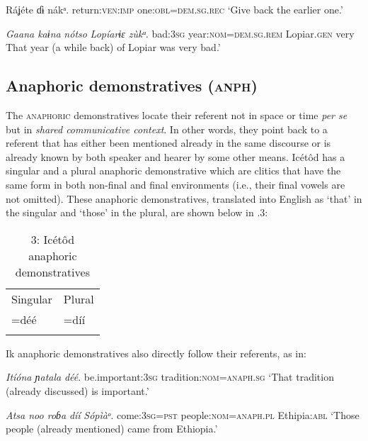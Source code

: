 Ráʝéte     ɗɨ nákᵃ.
return:\textsc{ven:imp}   one:\textsc{obl=dem.sg.rec}
‘Give back the earlier one.’




\textit{Gaana   kaɨna }\textit{nótso}\textit{       Lopíarɨɛ     zùkᵘ.}
bad:\textsc{3sg}   year:\textsc{nom}=\textsc{dem.sg.rem}   Lopiar.\textsc{gen} very
That year (a while back) of Lopiar was very bad.’






\subsection{Anaphoric demonstratives (\textsc{anph})}


The \textsc{anaphoric }demonstratives locate their referent not in space or time \textit{per se} but in \textit{shared communicative context}. In other words, they point back to a referent that has either been mentioned already in the same discourse or is already known by both speaker and hearer by some other means. Icétôd has a singular and a plural anaphoric demonstrative which are clitics that have the same form in both non-final and final environments (i.e., their final vowels are not omitted). These anaphoric demonstratives, translated into English as ‘that’ in the singular and ‘those’ in the plural, are shown below in .3:


\begin{table}
\caption{3: Icétôd anaphoric demonstratives}
\label{tab:6}


\begin{tabularx}{\textwidth}{XX}
\lsptoprule

Singular & Plural\\
=déé & =díí\\
\lspbottomrule
\end{tabularx}
\end{table}
Ik anaphoric demonstratives also directly follow their referents, as in:




\textit{Itíóna     ɲatala }\textit{déé}.
be.important:\textsc{3sg}   tradition:\textsc{nom}=\textsc{anaph.sg}
‘That tradition (already discussed) is important.’




\textit{Atsa noo     roɓa }\textit{díí}\textit{            Sópìàᵒ.}
come:\textsc{3sg}=\textsc{pst}   people:\textsc{nom}=\textsc{anaph.pl}  Ethipia:\textsc{abl}
‘Those people (already mentioned) came from Ethiopia.’






